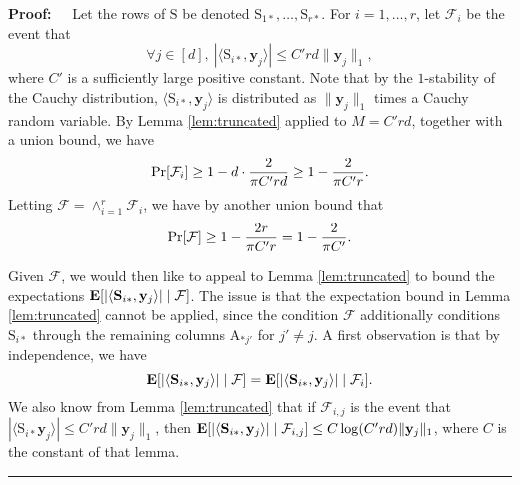 \documentclass[11pt]{article}
\newenvironment{proof}{\begin{trivlist} \item {\bf Proof:~~}}
  {\qed\end{trivlist}}
\newcommand{\mat}[1]{{\ensuremath{\bm{\mathrm{#1}}}}}
\def\matA{\mat{A}}
\def\matS{\mat{S}}
\def\frac#1#2{{#1\over #2}}
\def\qed{\hfill\rule{2mm}{2mm}}
\def\y{{\mathbf y}}
\begin{document}
\begin{proof}
Let the rows of $\matS$ be denoted $\matS_{1*}, \ldots, \matS_{r*}$. 
For $i = 1, \ldots, r$, let $\mathcal{F}_i$ be the event that 
$$\forall j \in [d], \ |\langle \matS_{i*}, \y_j \rangle | \leq C'rd \|\y_j\|_1,$$
where $C'$ is a sufficiently large positive constant. Note that by the $1$-stability of the Cauchy distribution,
$\langle \matS_{i*}, \y_j \rangle$ is distributed as $\|\y_j\|_1$ times a Cauchy random variable. 
By Lemma \ref{lem:truncated} applied to $M = C'rd$, together with a union bound, we
have $$\Pr[\mathcal{F}_i] \geq 1 - d \cdot \frac{2}{\pi C'rd} \geq 1 - \frac{2}{\pi C' r}.$$
Letting $\mathcal{F} = \wedge_{i=1}^r \mathcal{F}_i$, we have by another union bound that
$$\Pr[\mathcal{F}] \geq 1 - \frac{2r}{\pi C' r} = 1 - \frac{2}{\pi C'}.$$

Given $\mathcal{F}$, we would then like to appeal
to Lemma \ref{lem:truncated} to bound the expectations ${\bf E}[|\langle \matS_{i*}, \y_j \rangle| \mid \mathcal{F}]$. 
The issue
is that the expectation bound in Lemma \ref{lem:truncated} cannot be applied, since the condition
$\mathcal{F}$ additionally conditions $\matS_{i*}$ through the remaining columns $\matA_{*j'}$ 
for $j' \neq j$. A first observation
is that by independence, we have
$${\bf E}[|\langle \matS_{i*}, \y_j \rangle| \mid \mathcal{F}] 
= {\bf E}[|\langle \matS_{i*}, \y_j \rangle| \mid \mathcal{F}_i].$$
We also know from Lemma \ref{lem:truncated} that if $\mathcal{F}_{i,j}$ is the event that
$|\langle \matS_{i*} \y_j \rangle | \leq C'rd \|\y_j\|_1$, then 
${\bf E}[|\langle \matS_{i*}, \y_j \rangle| \mid \mathcal{F}_{i,j}] \leq C \log(C'rd) \|\y_j\|_1$, where $C$ is the constant
of that lemma.


\end{proof}
\end{document}
